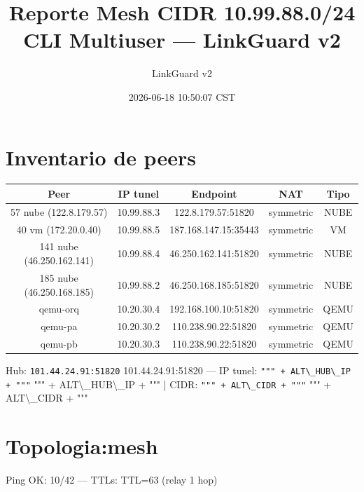 \documentclass[11pt,a4paper]{article}
\title{Reporte Mesh CIDR 10.99.88.0/24 CLI Multiuser — LinkGuard v2}
\author{LinkGuard v2}
\date{2026-06-18 10:50:07 CST}
\begin{document}
\maketitle

\section{Inventario de peers}
\begin{longtable}{|c|c|c|c|c|}
\hline
Peer & IP tunel & Endpoint & NAT & Tipo \\ \hline
57 nube (122.8.179.57) & 10.99.88.3 & 122.8.179.57:51820 & symmetric & NUBE \\ \hline
40 vm (172.20.0.40) & 10.99.88.5 & 187.168.147.15:35443 & symmetric & VM \\ \hline
141 nube (46.250.162.141) & 10.99.88.4 & 46.250.162.141:51820 & symmetric & NUBE \\ \hline
185 nube (46.250.168.185) & 10.99.88.2 & 46.250.168.185:51820 & symmetric & NUBE \\ \hline
qemu-orq & 10.20.30.4 & 192.168.100.10:51820 & symmetric & QEMU \\ \hline
qemu-pa & 10.20.30.2 & 110.238.90.22:51820 & symmetric & QEMU \\ \hline
qemu-pb & 10.20.30.3 & 110.238.90.22:51820 & symmetric & QEMU \\ \hline
\end{longtable}

Hub:  \texttt{101.44.24.91:51820} 101.44.24.91:51820  — IP tunel:  \texttt{""" + ALT\textbackslash{}_HUB\textbackslash{}_IP + """} """ + ALT\textbackslash{}_HUB\textbackslash{}_IP + """  | CIDR:  \texttt{""" + ALT\textbackslash{}_CIDR + """} """ + ALT\textbackslash{}_CIDR + """\\

\section{Topologia:mesh}
Ping OK: 10/42 — TTLs: TTL=63 (relay 1 hop)\\
\end{document}
